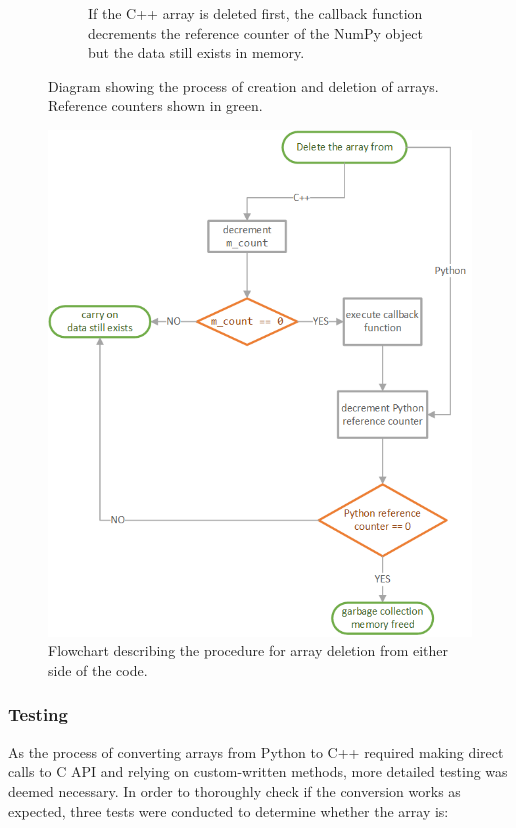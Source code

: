 \begin{figure}[h!]
\begin{subfigure}{0.9\textwidth}
        \caption{If the C++ array is deleted first, the callback function decrements 
        the reference counter of the NumPy object but the data still exists in memory.}
        \label{fig:array_creation_deletion_d}
    \end{subfigure}
    \caption{Diagram showing the process of creation and deletion of arrays. Reference 
    counters shown in green.}
    \label{fig:array_creation_deletion}
\end{figure}

\clearpage

\begin{figure}[h!]
    \centering
    \includegraphics{img/deletion_flowchart}
    \caption{Flowchart describing the procedure for array deletion from either side of 
    the code.}
    \label{fig:array_deletion}
\end{figure}

\subsubsection{Testing}

As the process of converting arrays from Python to C++ required making direct calls to 
C API and relying on custom-written methods, more detailed testing was deemed necessary. 
In order to thoroughly check if the conversion works as expected, three tests were 
conducted to determine whether the array is:

